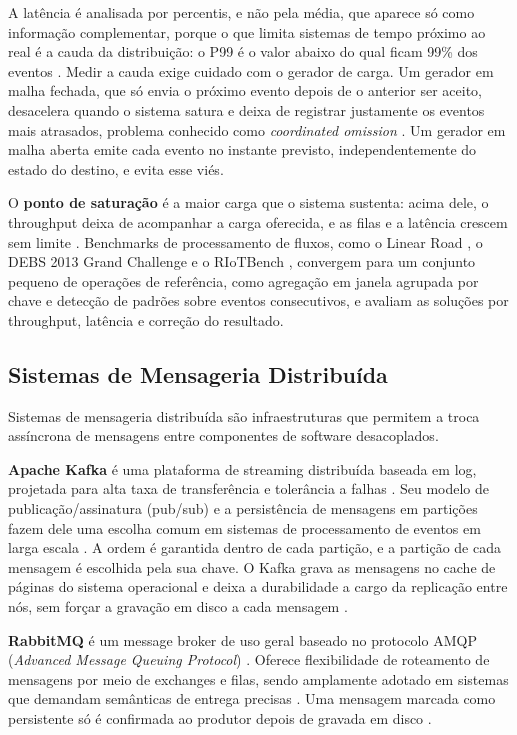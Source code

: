 \documentclass[12pt]{article}
\begin{document}
A latência é analisada por percentis, e não pela média, que aparece só como informação
complementar, porque o que limita sistemas de tempo próximo ao real é a cauda da
distribuição: o P99 é o valor abaixo do qual ficam
99\% dos eventos \cite{fu:2021}. Medir a cauda exige cuidado com o gerador de carga. Um
gerador em malha fechada, que só envia o próximo evento depois de o anterior ser aceito,
desacelera quando o sistema satura e deixa de registrar justamente os eventos mais
atrasados, problema conhecido como \textit{coordinated omission} \cite{tene:2015}. Um
gerador em malha aberta emite cada evento no instante previsto, independentemente do
estado do destino, e evita esse viés.

O \textbf{ponto de saturação} é a maior carga que o sistema sustenta: acima dele, o
throughput deixa de acompanhar a carga oferecida, e as filas e a latência crescem sem limite
\cite{jain:1991}. Benchmarks de processamento de fluxos, como o Linear Road
\cite{arasu:2004}, o DEBS 2013 Grand Challenge \cite{mutschler:2013} e o RIoTBench
\cite{shukla:2017}, convergem para um conjunto pequeno de operações de referência, como
agregação em janela agrupada por chave e detecção de padrões sobre eventos consecutivos,
e avaliam as soluções por throughput, latência e correção do resultado.

\subsection{Sistemas de Mensageria Distribuída}

Sistemas de mensageria distribuída são infraestruturas que permitem a troca assíncrona de
mensagens entre componentes de software desacoplados.

\textbf{Apache Kafka} é uma plataforma de streaming distribuída baseada em log, projetada
para alta taxa de transferência e tolerância a falhas \cite{kreps:2011}. Seu modelo de
publicação/assinatura (pub/sub) e a persistência de mensagens em partições fazem dele uma
escolha comum em sistemas de processamento de eventos em larga escala \cite{raptis:2024}.
A ordem é garantida dentro de cada partição, e a partição de cada mensagem é escolhida
pela sua chave. O Kafka grava as mensagens no cache de páginas do sistema operacional e
deixa a durabilidade a cargo da replicação entre nós, sem forçar a gravação em disco a
cada mensagem \cite{kafka:docs}.

\textbf{RabbitMQ} é um message broker de uso geral baseado no protocolo AMQP
(\textit{Advanced Message Queuing Protocol}) \cite{videla:2012}. Oferece flexibilidade de
roteamento de mensagens por meio de exchanges e filas, sendo amplamente adotado em sistemas
que demandam semânticas de entrega precisas \cite{dobbelaere:2017}. Uma mensagem marcada
como persistente só é confirmada ao produtor depois de gravada em disco \cite{rabbitmq:docs}.
\end{document}
